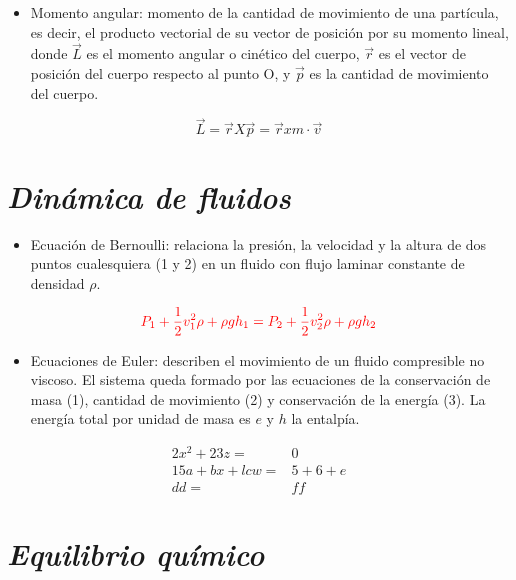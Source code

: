 \documentclass[letterpaper,12pt]{article}
\begin{document}
     \begin{itemize}
    \item [\ding{40}]
    \small{Momento angular: momento de la cantidad de movimiento de una partícula, es decir, el producto vectorial de su vector de posición por su momento lineal, donde $\vec{L}$ es el momento angular o cinético del cuerpo, $\vec{r}$ es el vector de posición del cuerpo respecto al punto O, y $\vec{p}$ es la cantidad de movimiento del cuerpo.}
    \end{itemize}
    \begin{equation*}%
    \vec{L}=\vec{r}X\vec{p}=\vec{r}xm\cdot \vec{v}
    \end{equation*}\vspace{3cm}
    
\section{\textit{Dinámica de fluidos}}%
    \begin{itemize}
    \item [\ding{106}]
    \small{Ecuación de Bernoulli: relaciona la presión, la velocidad y la altura de dos puntos cualesquiera (1 y 2) en un fluido con flujo laminar constante de densidad $\rho$}.
    \end{itemize}
    \begin{equation*}%
    \textcolor{red}{P_1+\frac{1}{2}v^2_1\rho+\rho gh_1=P_2+\frac{1}{2}v^2_2\rho+\rho gh_2}
\end{equation*}

     \begin{itemize}
    \item [\ding{109}]
    \small{Ecuaciones de Euler: describen el movimiento de un fluido compresible no viscoso. El sistema queda formado por las ecuaciones de la conservación de masa (1), cantidad de movimiento (2) y conservación de la energía (3). La energía total por unidad de masa es $e$ y $h$ la entalpía}.
    \end{itemize}
    \begin{align}
    {2x^2+23z}=&0\\
    15a+bx+lc\textit{w}=&5+6+e\\%
    dd=&ff
    \end{align}

\section{\textit{Equilibrio químico}}
\end{document}
